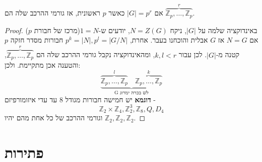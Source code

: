 \documentclass{tstextbook}
\begin{document}
\begin{corollary}
אם \(|G|=p^r\) כאשר \(p\) ראשונית, אז גורמי ההרכב שלה הם \(\overbrace{ \mathbb{Z}_{p},\dots,\mathbb{Z} _p }^{ r }\).

\end{corollary}
\begin{proof}
באינדוקציה שלמה על \(|G|\), ניקח \(N=Z(G)\), יודעים ש-\(1=N\)(מרכז
של חבורת \(p\)) אם \(N=G\) אז \(G\) אבלית והוכחנו בעבר. אחרת, \(p^k=|N|,p^l=|G / N|\) חבורות מסדר חזקה \(p\) קטנה מ-\(|G|\). לכן עבור \(k,l <r\), ומהאינדוקציה נקבל גורמי ההרכב שלה הם \(\overbrace{ \mathbb{Z} _p, \dots, \mathbb{Z} _p }^{ r }\), והטענה אכן מתקיימת. ולכן:
$$\underbrace{ \overbrace{ \mathbb{Z} _{p},\dots , \mathbb{Z} _{p} }^{ l }\quad \overbrace{ \mathbb{Z} _{p},\dots,\mathbb{Z} _{p} }^{ k } }_{ \text{G לש בכרה ימרוג} }$$\textbf{דוגמא}
יש חמישה חבורות מגודל 8 עד עדי איזומורפיזם -
$$\mathbb{Z} _{2}\times \mathbb{Z} _{4},\mathbb{Z} _{2}^3, \mathbb{Z} _{8},Q, D_{4}$$
וגורמי ההרכב של כל אחת מהם יהיו \(\mathbb{Z} _2,\mathbb{Z} _2,\mathbb{Z} _2\).

\end{proof}
\section{פתירות}
\end{document}
